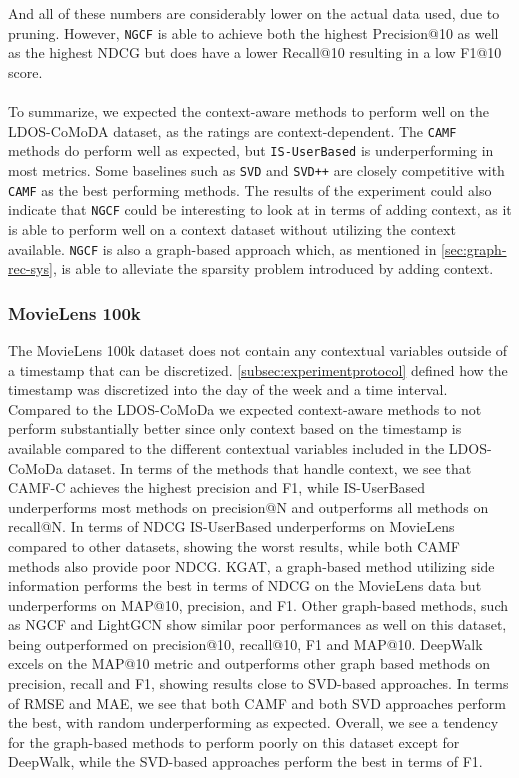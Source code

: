 And all of these numbers are considerably lower on the actual data used, due to pruning.
However, \texttt{NGCF} is able to achieve both the highest Precision@10 as well as the highest NDCG but does have a lower Recall@10 resulting in a low F1@10 score.
\\\\
To summarize, we expected the context-aware methods to perform well on the LDOS-CoMoDA dataset, as the ratings are context-dependent. 
The \texttt{CAMF} methods do perform well as expected, but \texttt{IS-UserBased} is underperforming in most metrics.
Some baselines such as \texttt{SVD} and \texttt{SVD++} are closely competitive with \texttt{CAMF} as the best performing methods.
The results of the experiment could also indicate that \texttt{NGCF} could be interesting to look at in terms of adding context, as it is able to perform well on a context dataset without utilizing the context available. 
\texttt{NGCF} is also a graph-based approach which, as mentioned in \autoref{sec:graph-rec-sys}, is able to alleviate the sparsity problem introduced by adding context.

\subsubsection{MovieLens 100k}
The MovieLens 100k dataset does not contain any contextual variables outside of a timestamp that can be discretized.
\autoref{subsec:experimentprotocol} defined how the timestamp was discretized into the day of the week and a time interval.
Compared to the LDOS-CoMoDa we expected context-aware methods to not perform substantially better since only context based on the timestamp is available compared to the different contextual variables included in the LDOS-CoMoDa dataset. 
In terms of the methods that handle context, we see that CAMF-C achieves the highest precision and F1, while IS-UserBased underperforms most methods on precision@N and outperforms all methods on recall@N.
In terms of NDCG IS-UserBased underperforms on MovieLens compared to other datasets, showing the worst results, while both CAMF methods also provide poor NDCG.
KGAT, a graph-based method utilizing side information performs the best in terms of NDCG on the MovieLens data but underperforms on MAP@10, precision, and F1.
Other graph-based methods, such as NGCF and LightGCN show similar poor performances as well on this dataset, being outperformed on precision@10, recall@10, F1 and MAP@10.
DeepWalk excels on the MAP@10 metric and outperforms other graph based methods on precision, recall and F1, showing results close to SVD-based approaches.
In terms of RMSE and MAE, we see that both CAMF and both SVD approaches perform the best, with random underperforming as expected.
Overall, we see a tendency for the graph-based methods to perform poorly on this dataset except for DeepWalk, while the SVD-based approaches perform the best in terms of F1.

